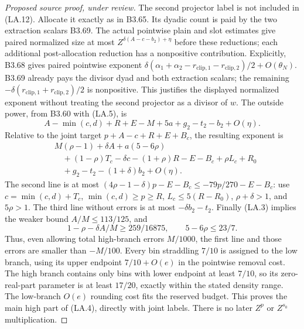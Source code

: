 \begin{proof}[Proposed source proof, under review]
The second projector label is not included in (LA.12). Allocate it
exactly as in B3.65. Its dyadic count is paid by the two extraction
scalars B3.69. The actual pointwise plain and slot estimates give
paired normalized size at most
$Z^{\delta(A-c-b_2)+\eta}$ before these reductions; each additional
post-allocation reduction has a nonpositive contribution. Explicitly,
B3.68 gives paired pointwise exponent
$\delta(\alpha_1+\alpha_2-r_{\mathrm{clip},1}
-r_{\mathrm{clip},2})/2+O(\theta_N)$.
B3.69 already pays the divisor dyad and both extraction scalars;
the remaining $-\delta(r_{\mathrm{clip},1}+r_{\mathrm{clip},2})/2$
is nonpositive. This justifies the displayed normalized exponent
without treating the second projector as a divisor of $w$. The outside
power, from B3.60 with (LA.5), is
\[
 A-\min(c,d)+R+E-M+5a+g_2-t_2-b_2+O(\eta).
\]
Relative to the joint target $p+A-c+R+E+B_c$, the resulting exponent is
\begin{align*}
 &M(\rho-1)+\delta A+a(5-6\rho)\\
 &\quad +(1-\rho)T_c-\delta c-(1+\rho)R-E-B_c
         +\rho L_c+R_0\\
 &\quad +g_2-t_2-(1+\delta)b_2+O(\eta).
 \tag{LA.13}
\end{align*}
The second line is at most
$(4\rho-1-\delta)p-E-B_c\le-79p/270-E-B_c$:
use $c=\min(c,d)+T_c$, $\min(c,d)\ge p\ge R$,
$L_c\le5(R-R_0)$, $\rho+\delta>1$, and $5\rho>1$.
The third line without errors is at most $-\delta b_2-t_2$.
Finally (LA.3) implies the weaker bound $A/M\le113/125$, and
\[
 1-\rho-\delta A/M\ge259/16875,
 \qquad 5-6\rho\le23/7.
\]
Thus, even allowing total high-branch errors $M/1000$, the first
line and those errors are smaller than $-M/100$. Every bin straddling
$7/10$ is assigned to the low branch, using its upper endpoint
$7/10+O(e)$ in the pointwise removal cost. The high branch contains
only bins with lower endpoint at least $7/10$, so its zero-real-part
parameter is at least $17/20$, exactly within the stated density
range. The low-branch $O(e)$ rounding cost fits the reserved budget.
This proves the main high part of
(LA.4), directly with joint labels. There is no later $Z^p$ or
$Z^{s_0}$ multiplication.


\end{proof}
